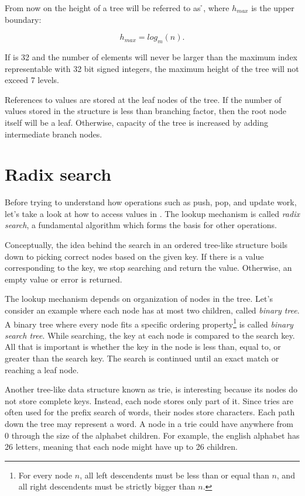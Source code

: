 From now on the height of a tree will be referred to as \h{}, where $h_{max}$ is the upper boundary:

\begin{equation}
    h_{max} = log_m(n).
\end{equation}

If \m{} is 32 and the number of elements will never be larger than the maximum index representable with 32 bit signed integers, the maximum height of the tree will not exceed 7 levels. 

References to values are stored at the leaf nodes of the tree. If the number of values stored in the structure is less than branching factor, then the root node itself will be a leaf. Otherwise, capacity of the tree is increased by adding intermediate branch nodes. 

\section{Radix search}
\label{sec:rb-tree-radix-search}

Before trying to understand how operations such as push, pop, and update work, let's take a look at how to access values in \rbtree{}. The lookup mechanism is called \emph{radix search}, a fundamental algorithm which forms the basis for other operations.

Conceptually, the idea behind the search in an ordered tree-like structure boils down to picking correct nodes based on the given key. If there is a value corresponding to the key, we stop searching and return the value. Otherwise, an empty value or error is returned.

The lookup mechanism depends on organization of nodes in the tree. Let's consider an example where each node has at most two children, called \emph{binary tree}. A binary tree where every node fits a specific ordering property\footnote{For every node $n$, all left descendents must be less than or equal than $n$, and all right descendents must be strictly bigger than $n$.} is called \emph{binary search tree}. While searching, the key at each node is compared to the search key. All that is important is whether the key in the node is less than, equal to, or greater than the search key. The search is continued until an exact match or reaching a leaf node.

Another tree-like data structure known as trie, is interesting because its nodes do not store complete keys. Instead, each node stores only part of it. Since tries are often used for the prefix search of words, their nodes store characters. Each path down the tree may represent a word. A node in a trie could have anywhere from 0 through the size of the alphabet children. For example, the english alphabet has 26 letters, meaning that each node might have up to 26 children.

